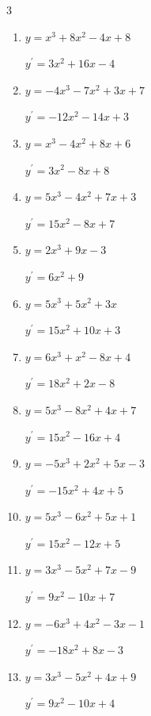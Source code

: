 \begin{multicols}{3}
\begin{enumerate}
  \item $y=x^{3}+8x^{2}-4x+8$

        $\displaystyle y^{\prime}=3x^{2}+16x-4$

  \item $y=-4x^{3}-7x^{2}+3x+7$

        $\displaystyle y^{\prime}=-12x^{2}-14x+3$

  \item $y=x^{3}-4x^{2}+8x+6$

        $\displaystyle y^{\prime}=3x^{2}-8x+8$

  \item $y=5x^{3}-4x^{2}+7x+3$

        $\displaystyle y^{\prime}=15x^{2}-8x+7$

  \item $y=2x^{3}+9x-3$

        $\displaystyle y^{\prime}=6x^{2}+9$

  \item $y=5x^{3}+5x^{2}+3x$

        $\displaystyle y^{\prime}=15x^{2}+10x+3$

  \item $y=6x^{3}+x^{2}-8x+4$

        $\displaystyle y^{\prime}=18x^{2}+2x-8$

  \item $y=5x^{3}-8x^{2}+4x+7$

        $\displaystyle y^{\prime}=15x^{2}-16x+4$

\columnbreak %

  \item $y=-5x^{3}+2x^{2}+5x-3$

        $\displaystyle y^{\prime}=-15x^{2}+4x+5$

  \item $y=5x^{3}-6x^{2}+5x+1$

        $\displaystyle y^{\prime}=15x^{2}-12x+5$

  \item $y=3x^{3}-5x^{2}+7x-9$

        $\displaystyle y^{\prime}=9x^{2}-10x+7$

  \item $y=-6x^{3}+4x^{2}-3x-1$

        $\displaystyle y^{\prime}=-18x^{2}+8x-3$

  \item $y=3x^{3}-5x^{2}+4x+9$

        $\displaystyle y^{\prime}=9x^{2}-10x+4$


\end{enumerate}
\end{multicols}
